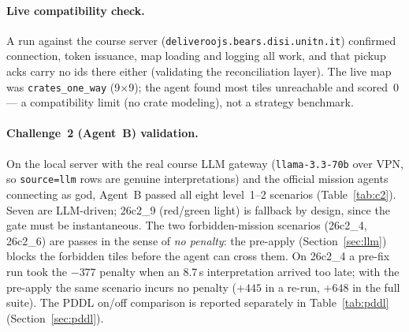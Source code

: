 \paragraph{Live compatibility check.} A run against the course server
(\texttt{deliveroojs.bears.disi.unitn.it}) confirmed connection, token
issuance, map loading and logging all work, and that pickup acks carry no ids
there either (validating the reconciliation layer). The live map was
\texttt{crates\_one\_way} (9$\times$9); the agent found most tiles unreachable
and scored~0 --- a compatibility limit (no crate modeling), not a strategy
benchmark.

\paragraph{Challenge~2 (Agent~B) validation.} On the local server with the real
course LLM gateway (\texttt{llama-3.3-70b} over VPN, so \texttt{source=llm} rows
are genuine interpretations) and the official mission agents connecting as god,
Agent~B passed all eight level~1--2 scenarios (Table~\ref{tab:c2}). Seven are
LLM-driven; 26c2\_9 (red/green light) is fallback by design, since the gate must
be instantaneous. The two forbidden-mission scenarios (26c2\_4, 26c2\_6) are
passes in the sense of \emph{no penalty}: the pre-apply (Section~\ref{sec:llm})
blocks the forbidden tiles before the agent can cross them. On 26c2\_4 a pre-fix
run took the $-377$ penalty when an 8.7\,s interpretation arrived too late;
with the pre-apply the same scenario incurs no penalty ($+445$ in a re-run,
$+648$ in the full suite). The PDDL on/off comparison is reported separately in
Table~\ref{tab:pddl} (Section~\ref{sec:pddl}).

